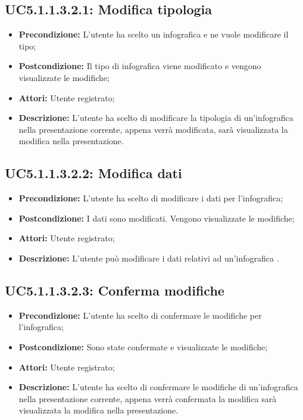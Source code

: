 \subsection{ UC5.1.1.3.2.1: Modifica tipologia}

\begin{itemize}
	\item \textbf{Precondizione:} L'utente ha scelto un infografica e ne vuole modificare il tipo;
	\item \textbf{Postcondizione:} Il tipo di infografica viene modificato e vengono visualizzate le modifiche;
	\item \textbf{Attori:} Utente registrato;
	\item \textbf{Descrizione:} L'utente ha scelto di modificare la tipologia di un'infografica nella presentazione corrente, appena verrà modificata, sarà visualizzata la modifica nella presentazione.
\end{itemize}
\subsection{ UC5.1.1.3.2.2: Modifica dati}

\begin{itemize}
	\item \textbf{Precondizione:} L'utente ha scelto di modificare i dati per l'infografica;
	\item \textbf{Postcondizione:} I dati sono modificati. Vengono visualizzate le modifiche;
	\item \textbf{Attori:} Utente registrato;
	\item \textbf{Descrizione:} L'utente può modificare i dati relativi ad un'infografica .
\end{itemize}
\subsection{ UC5.1.1.3.2.3: Conferma modifiche}

\begin{itemize}
	\item \textbf{Precondizione:} L'utente ha scelto di confermare le modifiche per l'infografica;
	\item \textbf{Postcondizione:} Sono state confermate e visualizzate le modifiche;
	\item \textbf{Attori:} Utente registrato;
	\item \textbf{Descrizione:} L'utente ha scelto di confermare le modifiche di un'infografica nella presentazione corrente, appena verrà confermata la modifica sarà visualizzata la modifica nella presentazione.
\end{itemize}
